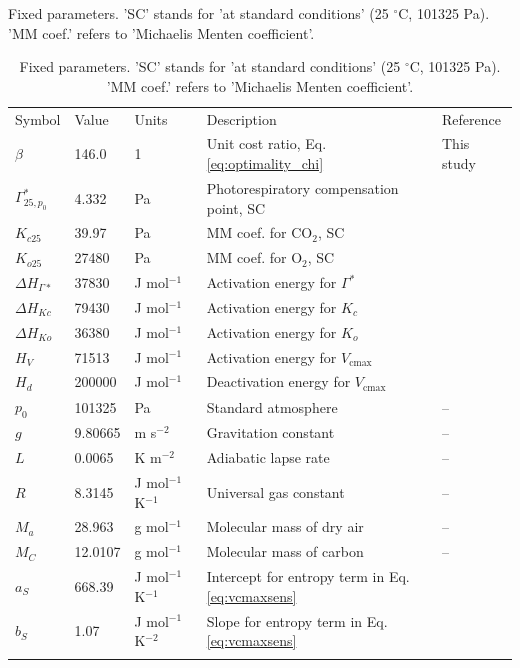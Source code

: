 \documentclass[gmd, manuscript]{copernicus}
\newcommand{\vcmax}{$V_{\text{cmax}}$}
\begin{document}
\begin{table}[t]
\caption{Fixed parameters. 'SC' stands for 'at standard conditions' (25 $^{\circ}$C, 101325 Pa). 'MM coef.' refers to 'Michaelis Menten coefficient'.}
\begin{tabular}{lllll}
  \tophline
    Symbol     & Value   & Units         & Description           &  Reference   \\
  \middlehline
    $\beta$      & 146.0     & 1             & Unit cost ratio, Eq. \ref{eq:optimality_chi} & This study \\
  $\Gamma^\ast_{25, p_0}$ & 4.332 & Pa & Photorespiratory compensation point, SC & \citet{bernacchi01} \\
  $K_{c25}$    & 39.97   & Pa            & MM coef. for CO$_2$, SC&  \citet{bernacchi01} \\
  $K_{o25}$    & 27480   & Pa            & MM coef. for O$_2$, SC&  \citet{bernacchi01} \\
  $\Delta H_{\Gamma\ast}$ & 37830 & J mol$^{-1}$ & Activation energy for $\Gamma^\ast$  & \citet{bernacchi01} \\
  $\Delta H_{Kc}$ & 79430  & J mol$^{-1}$  & Activation energy for $K_c$&  \citet{bernacchi01} \\
  $\Delta H_{Ko}$ & 36380  & J mol$^{-1}$  & Activation energy for $K_o$&  \citet{bernacchi01} \\
  $H_V$        & 71513   & J mol$^{-1}$  & Activation energy for \vcmax\ & \citet{kattge07} \\
  $H_d$        & 200000   & J mol$^{-1}$  & Deactivation energy for \vcmax\ & \citet{kattge07} \\
  $p_0$        & 101325  & Pa            & Standard atmosphere   & -- \\
  $g$          & 9.80665 & m s$^{-2}$    & Gravitation constant  & -- \\
  $L$          & 0.0065  & K m$^{-2}$    & Adiabatic lapse rate  & -- \\
  $R$          & 8.3145  & J mol$^{-1}$ K$^{-1}$ & Universal gas constant & -- \\
  $M_a$        & 28.963  & g mol$^{-1}$  & Molecular mass of dry air & -- \\
    $M_C$        & 12.0107 & g mol$^{-1} $ & Molecular mass of carbon & -- \\ 
  $a_S$        & 668.39  & J mol$^{-1}$ K$^{-1}$ & Intercept for entropy term in Eq. \ref{eq:vcmaxsens} & \citet{kattge07} \\
  $b_S$        & 1.07  & J mol$^{-1}$ K$^{-2}$ & Slope for entropy term in Eq. \ref{eq:vcmaxsens} & \citet{kattge07} \\
  \bottomhline
\end{tabular}
\caption{Fixed parameters. 'SC' stands for 'at standard conditions' (25 $^{\circ}$C, 101325 Pa). 'MM coef.' refers to 'Michaelis Menten coefficient'.}
\label{tab:params}
\end{table}
\clearpage
\end{document}
